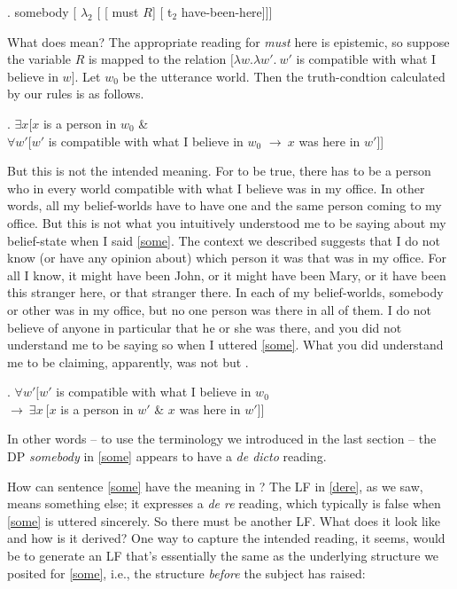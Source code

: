 \exi. \label{dere} somebody [ $\lambda_2$ [ [ must $R$] [ t$_2$ have-been-here]]]

What does \Last mean? The appropriate reading for \emph{must} here is epistemic, so suppose the variable $R$ is mapped to the relation $\bigl[\lambda w.\lambda w'.\ w'$ is compatible with what I believe in $w\bigr]$. Let $w_{0}$ be the utterance world. Then the truth-condtion calculated by our rules is as follows.

\ex. $\exists x [x$ is a person in $w_{0}$ \& \\
$\forall w'[w'$ is compatible with what I believe in $w_{0}$ $\rightarrow\ x$ was here in $w'$]]

But this is not the intended meaning. For \Last to be true, there has to be a person who in every world compatible with what I believe was in my office. In other words, all my belief-worlds have to have one and the same person coming to my office. But this is not what you intuitively understood me to be saying about my belief-state when I said \ref{some}. The context we described suggests that I do not know (or have any opinion about) which person it was that was in my office. For all I know, it might have been John, or it might have been Mary, or it have been this stranger here, or that stranger there. In each of my belief-worlds, somebody or other was in my office, but no one person was there in all of them. I do not believe of anyone in particular that he or she was there, and you did not understand me to be saying so when I uttered \ref{some}. What you did understand me to be claiming, apparently, was not \Last but \Next.

\ex. \label{dedic} $\forall w' [ w'$ is compatible with what I believe in $w_{0}$\\
\null\hfill$\rightarrow\ \exists x\ [x$ is a person in $w'$ \& $x$ was here in $w']]$

In other words -- to use the terminology we introduced in the last section -- the DP \emph{somebody} in \ref{some} appears to have a \emph{de dicto} reading.

How can sentence \ref{some} have the meaning in \Last? The LF in \ref{dere}, as we saw, means something else; it expresses a \emph{de re} reading, which typically is false when \ref{some} is uttered sincerely. So there must be another LF. What does it look like and how is it derived? One way to capture the intended reading, it seems, would be to generate an LF that's essentially the same as the underlying structure we posited for \ref{some}, i.e., the structure \emph{before} the subject has raised:

